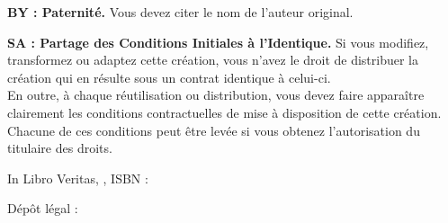 {\setlength{\parskip}{1.5\baselineskip}
	\textbf{BY : Paternité.} Vous devez citer le nom de l'auteur original.\par
	\textbf{SA : Partage des Conditions Initiales à l'Identique.} Si vous modifiez, transformez ou adaptez cette création, vous n'avez le droit de distribuer la création qui en résulte sous un contrat identique à celui-ci.\\
	En outre, à chaque réutilisation ou distribution, vous devez faire apparaître clairement les conditions contractuelles de mise à disposition de cette création. Chacune de ces conditions peut être levée si vous obtenez l'autorisation du titulaire des droits.\par
}
{\centering\setlength{\parskip}{2\baselineskip}
	In Libro Veritas, \anneedepot{}, ISBN : \isbn\par
	Dépôt légal : \datedepot\par
}
